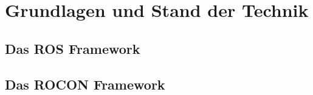 %
%
\chapter{Grundlagen und Stand der Technik} \label{Kap:2}


\section{Das ROS Framework}

\section{Das ROCON Framework}

